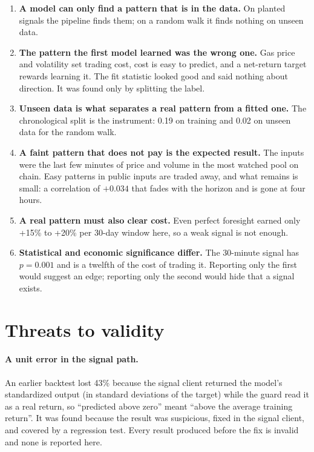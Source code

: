 \documentclass[11pt,a4paper]{article}
\begin{document}
\begin{enumerate}
\item \textbf{A model can only find a pattern that is in the data.} On
  planted signals the pipeline finds them; on a random walk it finds
  nothing on unseen data.
\item \textbf{The pattern the first model learned was the wrong one.} Gas
  price and volatility set trading cost, cost is easy to predict, and a
  net-return target rewards learning it. The fit statistic looked good and
  said nothing about direction. It was found only by splitting the label.
\item \textbf{Unseen data is what separates a real pattern from a fitted
  one.} The chronological split is the instrument: 0.19 on training and 0.02
  on unseen data for the random walk.
\item \textbf{A faint pattern that does not pay is the expected result.}
  The inputs were the last few minutes of price and volume in the most watched
  pool on chain. Easy patterns in public inputs are traded away, and what
  remains is small: a correlation of $+0.034$ that fades with the horizon and
  is gone at four hours.
\item \textbf{A real pattern must also clear cost.} Even perfect foresight
  earned only +15\% to +20\% per 30-day window here, so a weak signal is
  not enough.
\item \textbf{Statistical and economic significance differ.} The 30-minute
  signal has $p=0.001$ and is a twelfth of the cost of trading it. Reporting
  only the first would suggest an edge; reporting only the second would
  hide that a signal exists.
\end{enumerate}

\section{Threats to validity}
\label{sec:validity}

\paragraph{A unit error in the signal path.}
An earlier backtest lost 43\% because the signal client returned the model's
standardized output (in standard deviations of the target) while the guard
read it as a real return, so ``predicted above zero'' meant ``above the
average training return''. It was found because the result was suspicious,
fixed in the signal client, and covered by a regression test. Every result
produced before the fix is invalid and none is reported here.
\end{document}
